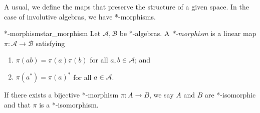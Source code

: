 A usual, we define the maps that preserve the structure of a given space. In the case of involutive algebras, we have *-morphisms.
\begin{definition}{*-morphism}{star_morphism}
    Let \(\mathscr{A}, \mathscr{B}\) be *-algebras. A \emph{*-morphism} is a linear map \(\pi : \mathscr{A} \to \mathscr{B}\) satisfying
    \begin{enumerate}[label=(\alph*)]
        \item \(\pi(ab) = \pi(a) \pi(b)\) for all \(a, b \in \mathscr{A}\); and
        \item \(\pi(a^*) = \pi(a)^*\) for all \(a \in \mathscr{A}\).
    \end{enumerate}
    If there exists a bijective *-morphism \(\pi: A \to B\), we say \(A\) and \(B\) are *-isomorphic and that \(\pi\) is a *-isomorphism.
\end{definition}
